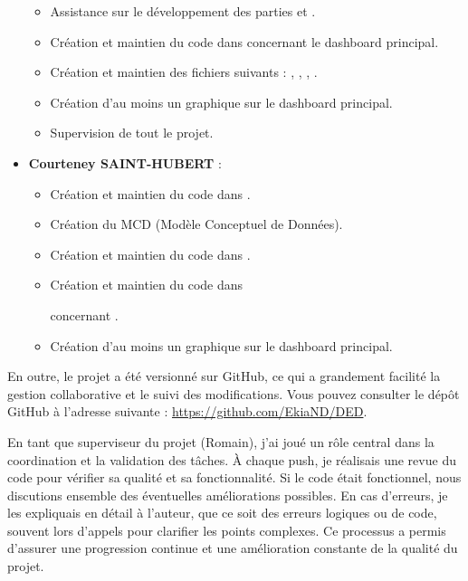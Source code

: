 \documentclass[11pt]{article}
\begin{document}
\begin{itemize}
\begin{itemize}
      \item Assistance sur le développement des parties \texttt{} et \texttt{}.
           \item Création et maintien du code dans \texttt{} concernant le dashboard principal.
      \item Création et maintien des fichiers suivants : \texttt{}, \texttt{}, \texttt{}, \texttt{}.
      \item Création d'au moins un graphique sur le dashboard principal.
      \item Supervision de tout le projet.
    \end{itemize}
  \item \textbf{Courteney SAINT-HUBERT} :
    \begin{itemize}
      \item Création et maintien du code dans \texttt{}.
      \item Création du MCD (Modèle Conceptuel de Données).
      \item Création et maintien du code dans \texttt{}.
      \item Création et maintien du code dans \texttt{} \par concernant \texttt{}.
      \item Création d'au moins un graphique sur le dashboard principal.
    \end{itemize}
\end{itemize}

En outre, le projet a été versionné sur GitHub, ce qui a grandement facilité la gestion collaborative et le suivi des modifications. Vous pouvez consulter le dépôt GitHub à l'adresse suivante : 
\href{https://github.com/EkiaND/DED}{https://github.com/EkiaND/DED}.

En tant que superviseur du projet (Romain), j'ai joué un rôle central dans la coordination et la validation des tâches. À chaque push, je réalisais une revue du code pour vérifier sa qualité et sa fonctionnalité. Si le code était fonctionnel, nous discutions ensemble des éventuelles améliorations possibles. En cas d'erreurs, je les expliquais en détail à l'auteur, que ce soit des erreurs logiques ou de code, souvent lors d'appels pour clarifier les points complexes. Ce processus a permis d'assurer une progression continue et une amélioration constante de la qualité du projet.
\end{document}
